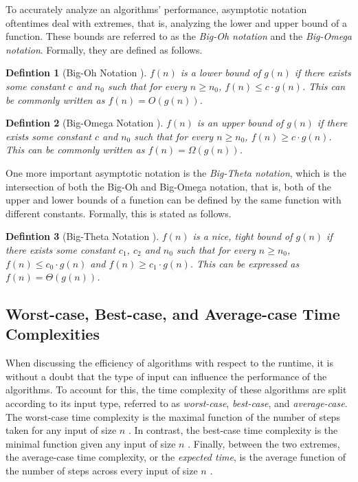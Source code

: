 \documentclass{report}
\newtheorem{definition}{Defintion}
\begin{document}
To accurately analyze an algorithms' performance, asymptotic notation oftentimes deal with extremes, that is, analyzing the lower and upper bound of a function. These bounds are referred to as the \textit{Big-Oh notation} and the \textit{Big-Omega notation}. Formally, they are defined as follows.
\begin{definition}[Big-Oh Notation \autocite{skienaAlgorithmDesignManual2010}]
	$f(n)$ is a lower bound of $g(n)$ if there exists some constant $c$ and $n_0$ such that for every $n \geq n_0$, $f(n) \leq c \cdot g(n)$. This can be commonly written as $f(n) = O(g(n))$.
\end{definition}
\begin{definition}[Big-Omega Notation \autocite{skienaAlgorithmDesignManual2010}]
	$f(n)$ is an upper bound of $g(n)$ if there exists some constant $c$ and $n_0$ such that for every $n \geq n_0$, $f(n) \geq c \cdot g(n)$. This can be commonly written as $f(n) = \Omega(g(n))$.
\end{definition}

One more important asymptotic notation is the \textit{Big-Theta notation}, which is the intersection of both the Big-Oh and Big-Omega notation, that is, both of the upper and lower bounds of a function can be defined by the same function with different constants. Formally, this is stated as follows.
\begin{definition}[Big-Theta Notation \autocite{skienaAlgorithmDesignManual2010}]
	$f(n)$ is a nice, tight bound of $g(n)$ if there exists some constant $c_1$, $c_2$ and $n_0$ such that for every $n \geq n_0$, $f(n) \leq c_0 \cdot g(n)$ and $f(n) \geq c_1 \cdot g(n)$. This can be expressed as $f(n) = \Theta(g(n))$.
\end{definition}

\subsection{Worst-case, Best-case, and Average-case Time Complexities}
When discussing the efficiency of algorithms with respect to the runtime, it is without a doubt that the type of input can influence the performance of the algorithms. To account for this, the time complexity of these algorithms are split according to its input type, referred to as \textit{worst-case}, \textit{best-case}, and \textit{average-case}. The worst-case time complexity is the maximal function of the number of steps taken for any input of size $n$ \autocite{skienaAlgorithmDesignManual2010}. In contrast, the best-case time complexity is the minimal function given any input of size $n$ \autocite{skienaAlgorithmDesignManual2010}. Finally, between the two extremes, the average-case time complexity, or the \textit{expected time}, is the average function of the number of steps across every input of size $n$ \autocite{skienaAlgorithmDesignManual2010}.
\end{document}
